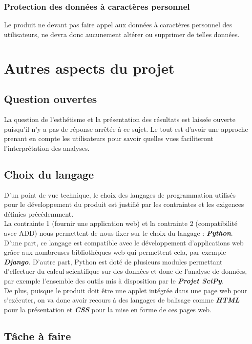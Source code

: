 			\subsubsection{Protection des données à caractères personnel}
			Le produit ne devant pas faire appel aux données à caractères personnel des utilisateurs, ne devra donc aucunement altérer ou supprimer de telles données.		
		
	\section{Autres aspects du projet}
		\subsection{Question ouvertes}
			La question de l'esthétisme et la présentation des résultats est laissée ouverte puisqu'il n'y a pas de réponse arrêtée à ce sujet. Le tout est d'avoir une approche prenant en compte les utilisateurs pour savoir quelles vues faciliteront l'interprétation des analyses.
			
		\subsection{Choix du langage}
				D'un point de vue technique, le choix des langages de programmation utilisés pour le développement du produit est justifié par les contraintes et les exigences définies précédemment.\\
		La contrainte 1 (fournir une application web) et la contrainte 2 (compatibilité avec ADD) nous permettent de nous fixer sur le choix du langage : \textbf{\textit{Python}}.\\
		D'une part, ce langage est compatible avec le développement d'applications web grâce aux nombreuses bibliothèques web qui permettent cela, par exemple \textbf{\textit{Django}}. D'autre part, Python est doté de plusieurs modules permettant d'effectuer du calcul scientifique sur des données et donc de l'analyse de données, par exemple l'ensemble des outils mis à disposition par le \textbf{\textit{Projet SciPy}}.\\
		De plus, puisque le produit doit être une applet intégrée dans une page web pour s'exécuter, on va donc avoir recours à des langages de balisage comme \textbf{\textit{HTML}} pour la présentation et \textbf{\textit{CSS}} pour la mise en forme de ces pages web.

		\subsection{Tâche à faire}
